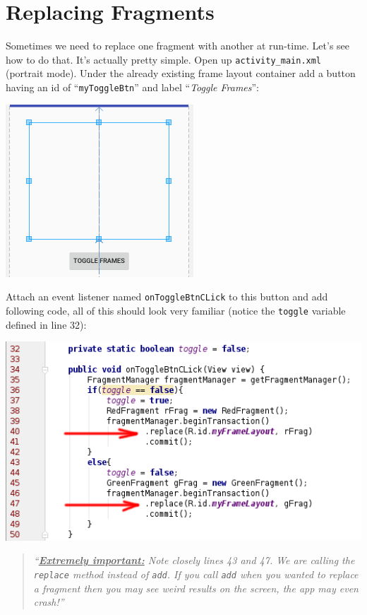 \section{Replacing Fragments}
Sometimes we need to replace one fragment with another at run-time. Let's see how to do that. It's actually pretty simple. Open up \texttt{activity\_main.xml} (portrait mode). Under the already existing frame layout container add a button having an id of ``\texttt{myToggleBtn}'' and label ``\textit{Toggle Frames}'':

\begin{center}
	\includegraphics[scale=\FigureScale]{chapters/ch11/images/21}
\end{center}

Attach an event listener named \texttt{onToggleBtnCLick} to this button and add following code, all of this should look very familiar (notice the \texttt{toggle} variable defined in line 32):

\begin{center}
	\includegraphics[scale=\SourceCodeScale]{chapters/ch11/images/22}
\end{center}

\begin{quote}
	\textit{``\underline{\textbf{Extremely important:}} Note closely lines 43 and 47. We are calling the \texttt{replace} method instead of \texttt{add}. If you call \texttt{add} when you wanted to replace a fragment then you may see weird results on the screen, the app may even crash!''}
\end{quote}

